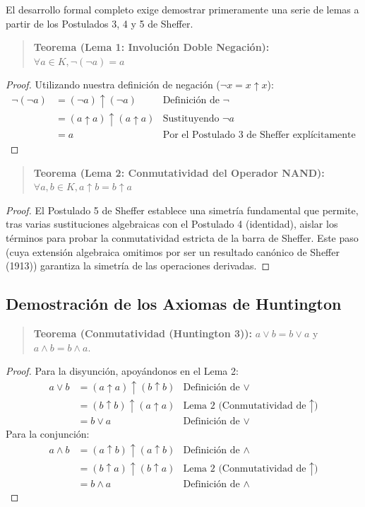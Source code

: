El desarrollo formal completo exige demostrar primeramente una serie de lemas a partir de los Postulados 3, 4 y 5 de Sheffer.

\begin{quote}\textbf{Teorema (Lema 1: Involución Doble Negación):}\label{sheffer_inv}
$\forall a \in K, \neg(\neg a) = a$
\end{quote}
\begin{proof}
Utilizando nuestra definición de negación ($\neg x = x \uparrow x$):
\begin{align*}
\neg(\neg a) &= (\neg a) \uparrow (\neg a) & \text{Definición de } \neg \\
&= (a \uparrow a) \uparrow (a \uparrow a) & \text{Sustituyendo } \neg a \\
&= a & \text{Por el Postulado 3 de Sheffer explícitamente}
\end{align*}
\end{proof}

\begin{quote}\textbf{Teorema (Lema 2: Conmutatividad del Operador NAND):}\label{sheffer_conmut}
$\forall a,b \in K, a \uparrow b = b \uparrow a$
\end{quote}
\begin{proof}
El Postulado 5 de Sheffer establece una simetría fundamental que permite, tras varias sustituciones algebraicas con el Postulado 4 (identidad), aislar los términos para probar la conmutatividad estricta de la barra de Sheffer. Este paso (cuya extensión algebraica omitimos por ser un resultado canónico de Sheffer (1913)) garantiza la simetría de las operaciones derivadas.
\end{proof}

\subsection{Demostración de los Axiomas de Huntington}

\begin{quote}\textbf{Teorema (Conmutatividad (Huntington 3)):}\label{hunt_conmut_sheffer}
$a \vee b = b \vee a$ y $a \wedge b = b \wedge a.$
\end{quote}
\begin{proof}
Para la disyunción, apoyándonos en el Lema 2:
\begin{align*}
a \vee b &= (a \uparrow a) \uparrow (b \uparrow b) & \text{Definición de } \vee \\
&= (b \uparrow b) \uparrow (a \uparrow a) & \text{Lema 2 (Conmutatividad de } \uparrow\text{)} \\
&= b \vee a & \text{Definición de } \vee
\end{align*}
Para la conjunción:
\begin{align*}
a \wedge b &= (a \uparrow b) \uparrow (a \uparrow b) & \text{Definición de } \wedge \\
&= (b \uparrow a) \uparrow (b \uparrow a) & \text{Lema 2 (Conmutatividad de } \uparrow\text{)} \\
&= b \wedge a & \text{Definición de } \wedge
\end{align*}
\end{proof}

